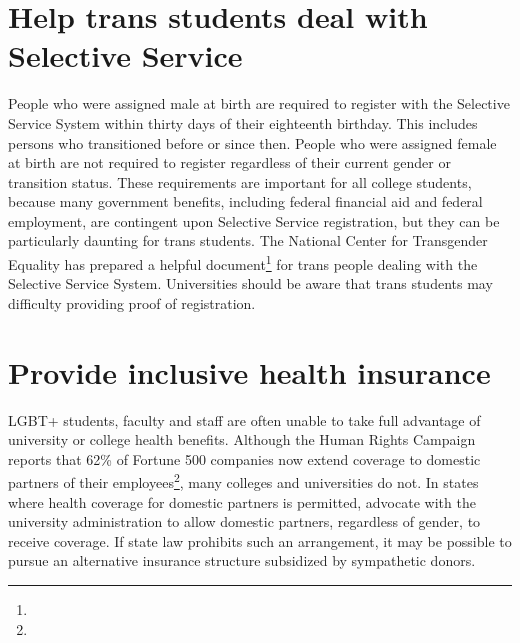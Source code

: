 \section {Help trans students deal with Selective Service}
\label{univ-trans}
People who were assigned male at birth are required to register with the Selective Service System within thirty days of their eighteenth birthday.  This includes persons who transitioned before or since then. People who were assigned female at birth are not required to register regardless of their current gender or transition status.  These requirements are important for all college students, because many government benefits, including federal financial aid and federal employment, are contingent upon Selective Service registration, but they can be particularly daunting for trans students.  The National Center for Transgender Equality has prepared a helpful document\footnote{} for trans people dealing with the Selective Service System.  Universities should be aware that trans students may difficulty providing proof of registration.


\section {Provide inclusive health insurance}
\label{health-insurance}
LGBT+ students, faculty and staff are often unable to take full advantage of university or college health benefits.  Although the Human Rights Campaign reports that 62\% of Fortune 500 companies now extend coverage to domestic partners of their employees\footnote{}, many colleges and universities do not.  In states where health coverage for domestic partners is permitted, advocate with the university administration to allow domestic partners, regardless of gender, to receive coverage. If state law prohibits such an arrangement, it may be possible to pursue an alternative insurance structure subsidized by sympathetic donors. 

